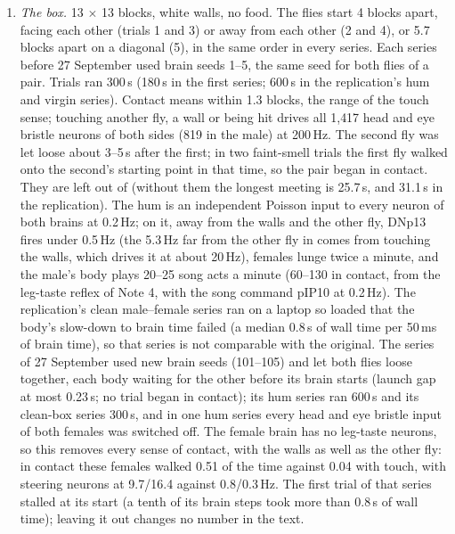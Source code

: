 \begin{enumerate}[leftmargin=*, label=\arabic*., itemsep=4pt]
\item \emph{The box.} 13 $\times$ 13 blocks, white walls, no food. The flies start 4 blocks apart, facing each other (trials 1 and 3) or away from each other (2 and 4), or 5.7 blocks apart on a diagonal (5), in the same order in every series. Each series before 27 September used brain seeds 1--5, the same seed for both flies of a pair. Trials ran 300\,s (180\,s in the first series; 600\,s in the replication's hum and virgin series). Contact means within 1.3 blocks, the range of the touch sense; touching another fly, a wall or being hit drives all 1{,}417 head and eye bristle neurons of both sides (819 in the male) at 200\,Hz. The second fly was let loose about 3--5\,s after the first; in two faint-smell trials the first fly walked onto the second's starting point in that time, so the pair began in contact. They are left out of  (without them the longest meeting is 25.7\,s, and 31.1\,s in the replication). The hum is an independent Poisson input to every neuron of both brains at 0.2\,Hz; on it, away from the walls and the other fly, DNp13 fires under 0.5\,Hz (the 5.3\,Hz far from the other fly in  comes from touching the walls, which drives it at about 20\,Hz), females lunge twice a minute, and the male's body plays 20--25 song acts a minute (60--130 in contact, from the leg-taste reflex of Note 4, with the song command pIP10 at 0.2\,Hz). The replication's clean male--female series ran on a laptop so loaded that the body's slow-down to brain time failed (a median 0.8\,s of wall time per 50\,ms of brain time), so that series is not comparable with the original. The series of 27 September used new brain seeds (101--105) and let both flies loose together, each body waiting for the other before its brain starts (launch gap at most 0.23\,s; no trial began in contact); its hum series ran 600\,s and its clean-box series 300\,s, and in one hum series every head and eye bristle input of both females was switched off. The female brain has no leg-taste neurons, so this removes every sense of contact, with the walls as well as the other fly: in contact these females walked 0.51 of the time against 0.04 with touch, with steering neurons at 9.7/16.4 against 0.8/0.3\,Hz. The first trial of that series stalled at its start (a tenth of its brain steps took more than 0.8\,s of wall time); leaving it out changes no number in the text.


\end{enumerate}
